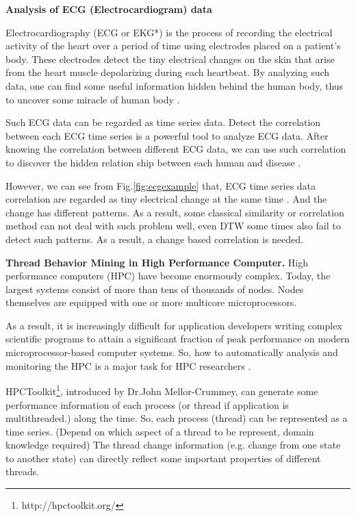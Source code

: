 \textbf{Analysis of ECG (Electrocardiogram) data}

Electrocardiography \cite{holter1961new} (ECG or EKG*) 
is the process of recording the electrical activity of the heart over a period of time using electrodes placed on a patient's body. 
These electrodes detect the tiny electrical changes on the skin that arise from the heart muscle depolarizing during each heartbeat. 
By analyzing such data, one can find some useful information hidden behind the human body, thus to uncover some miracle of human body \cite{tilley1979essentials}.

Such ECG data can be regarded as time series data. Detect the correlation between each ECG time series is a powerful tool to analyze ECG data. After knowing the correlation between different ECG data, we can use such correlation to discover the hidden relation ship between each human and disease \cite{marriott1988practical}.

However, we can see from Fig.\ref{fig:ecgexample} that, ECG time series data correlation are regarded as tiny electrical change at the same time \cite{tilley1979essentials}. And the change has different patterns. As a result, some classical similarity or correlation method can not deal with such problem well, even DTW some times also fail to detect such patterns. As a result, a change based correlation is needed.


\textbf{Thread Behavior Mining in High Performance Computer.}
High performance computers (HPC) have become enormously complex. Today, the largest systems consist of more than tens of thousands of nodes. Nodes themselves are equipped with one or more multicore microprocessors\cite{adhianto2010hpctoolkit}. 

As a result, it is increasingly difficult for application developers writing complex scientific programs to attain a significant fraction of peak performance on modern microprocessor-based computer systems. 
So, how to automatically analysis and monitoring the HPC is a major task for HPC researchers \cite{mccurdy2010memphis,tallent2009effective}.

HPCToolkit\footnote{http://hpctoolkit.org/}, introduced by Dr.John Mellor-Crummey, can generate some performance information of each process (or thread if application is multithreaded.) along the time. So, each process (thread) can be represented as a time series. (Depend on which aspect of a thread to be represent, domain knowledge required) The thread change information (e.g. change from one state to another state) can directly reflect some important properties of different threads. 

